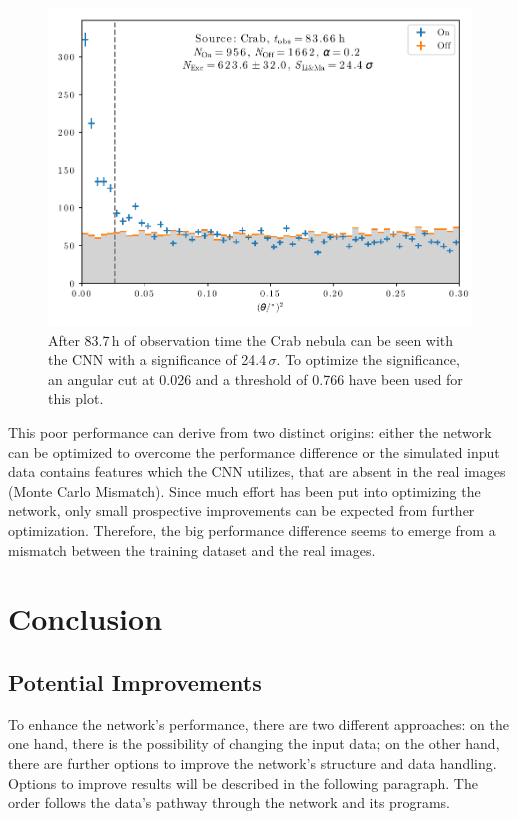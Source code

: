 \begin{figure}
    \centering
    \includegraphics[scale=0.8]{Plots/Theta_Plot.pdf}
    \caption{After \num{83.7}\,\si{\hour} of observation time the Crab nebula can be seen with the CNN with a significance of \num{24.4}\,$\sigma$. To optimize the significance, an angular cut at \num{0.026} and a threshold of \num{0.766} have been used for this plot.}
    \label{fig:theta_plot}
\end{figure}

This poor performance can derive from two distinct origins:
either the network can be optimized to overcome the performance difference
or the simulated input data contains features which the CNN utilizes,
that are absent in the real images (Monte Carlo Mismatch).
Since much effort has been put into optimizing the network,
only small prospective improvements can be expected from further optimization.
Therefore, the big performance difference seems to emerge from a mismatch between the training dataset and the real images.


\chapter{Conclusion}
\section{Potential Improvements}
To enhance the network's performance, there are two different approaches:
on the one hand, there is the possibility of changing the input data;
on the other hand, there are further options to improve the network's structure and data handling.
Options to improve results will be described in the following paragraph.
The order follows the data's pathway through the network and its programs.

